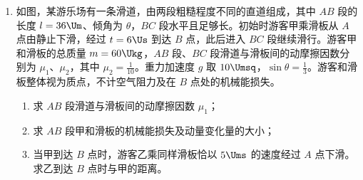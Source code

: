 \documentclass[\gkver]{gaokaozhenti}
\begin{document}
\begin{enumerate}
{代入数据解得 $\Delta V=1314\UmL$。
}

\item
如图，某游乐场有一条滑道，由两段粗糙程度不同的直道组成，其中 $AB$ 段的长度 $l=36\Um$、倾角为 $\theta$，$BC$ 段水平且足够长。初始时游客甲乘滑板从 $A$ 点由静止下滑，经过 $t=6\Us$ 到达 $B$ 点，此后进入 $BC$ 段继续滑行。游客甲和滑板的总质量 $m=60\Ukg$，$AB$ 段、$BC$ 段滑道与滑板间的动摩擦因数分别为 $\mu_{1}$、$\mu_{2}$，其中 $\mu_{2}=\frac{1}{10}$。重力加速度 $g$ 取 $10\Umsq$，$\sin\theta=\frac{1}{3}$。游客和滑板整体视为质点，不计空气阻力及在 $B$ 点处的机械能损失。
\begin{enumerate}
	\item
	求 $AB$ 段滑道与滑板间的动摩擦因数 $\mu_{1}$；
	\item
	求 $AB$ 段甲和滑板的机械能损失及动量变化量的大小；
	\item
	当甲到达 $B$ 点时，游客乙乘同样滑板恰以 $5\Ums$ 的速度经过 $A$ 点下滑。求乙到达 $B$ 点时与甲的距离。
\end{enumerate}
\onepicture[align=right, w=12.02cm]{}

\end{enumerate}
\end{document}
